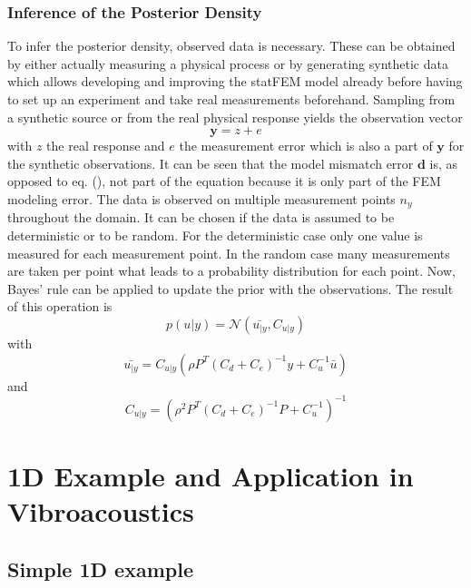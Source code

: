 \documentclass[%
  a4paper,oneside,%
  11pt,%
  smallchapters,
  green,%
  rgb, <cmyk>
  ,]{tubsbook}
\begin{document}
\subsection{Inference of the Posterior Density}
To infer the posterior density, observed data is necessary. These can be obtained by either actually measuring a physical process or by generating synthetic data which allows developing and improving the statFEM model already before having to set up an experiment and take real measurements beforehand.
%
Sampling from a synthetic source or from the real physical response yields the observation vector
%
\begin{equation}
\bm{y} = {z} + {e}
\end{equation}
%
with $z$ the real response and $e$ the measurement error which is also a part of $\bm{y}$ for the synthetic observations. It can be seen that the model mismatch error $\bm{d}$ is, as opposed to eq. (), not part of the equation because it is only part of the FEM modeling error. 
%
The data is observed on multiple measurement  points $n_y$ throughout the domain. It can be chosen if the data is assumed to be deterministic or to be random. For the deterministic case only one value is measured for each measurement point. In the random case many measurements are taken per point what leads to a probability distribution for each point.
%
Now, Bayes' rule can be applied to update the prior with the observations.
The result of this operation is
%
\begin{equation}
p(u|y) = \mathcal{N}(\bar{u_{|y}}, C_{u|y})
\end{equation}
%
with
%
\begin{equation}
\bar{u_{|y}} = C_{u|y} \left(   \rho P^T  (C_d + C_e)^{-1}  y  +  C_u^{-1}  \bar{u}   \right)
\end{equation}
and
\begin{equation}
C_{u|y} = \left(      \rho^2  P^T   (C_d + C_e)^{-1}  P  +  C_u^{-1}    \right)^{-1}
\end{equation}

\chapter{1D Example and Application in Vibroacoustics}

\section{Simple 1D example}
\end{document}
